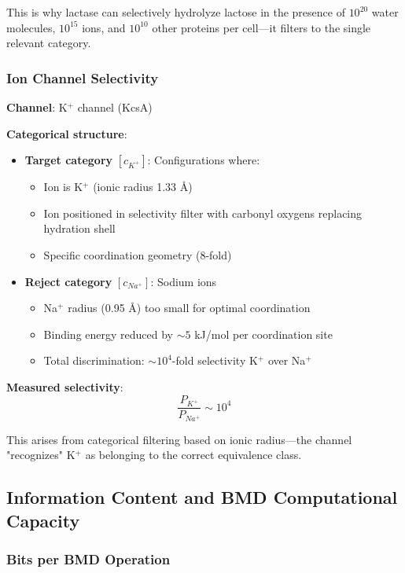 \documentclass[11pt,a4paper]{article}
\begin{document}
This is why lactase can selectively hydrolyze lactose in the presence of $10^{20}$ water molecules, $10^{15}$ ions, and $10^{10}$ other proteins per cell—it filters to the single relevant category.

\subsubsection{Ion Channel Selectivity}

\textbf{Channel}: K$^+$ channel (KcsA)

\textbf{Categorical structure}:
\begin{itemize}
\item \textbf{Target category} $[c_{K^+}]$: Configurations where:
  \begin{itemize}
  \item Ion is K$^+$ (ionic radius 1.33 Å)
  \item Ion positioned in selectivity filter with carbonyl oxygens replacing hydration shell
  \item Specific coordination geometry (8-fold)
  \end{itemize}
  
\item \textbf{Reject category} $[c_{Na^+}]$: Sodium ions
  \begin{itemize}
  \item Na$^+$ radius (0.95 Å) too small for optimal coordination
  \item Binding energy reduced by $\sim 5$ kJ/mol per coordination site
  \item Total discrimination: $\sim 10^4$-fold selectivity K$^+$ over Na$^+$
  \end{itemize}
\end{itemize}

\textbf{Measured selectivity}:
\begin{equation}
\frac{P_{K^+}}{P_{Na^+}} \sim 10^4
\end{equation}

This arises from categorical filtering based on ionic radius—the channel "recognizes" K$^+$ as belonging to the correct equivalence class.

\subsection{Information Content and BMD Computational Capacity}

\subsubsection{Bits per BMD Operation}
\end{document}
